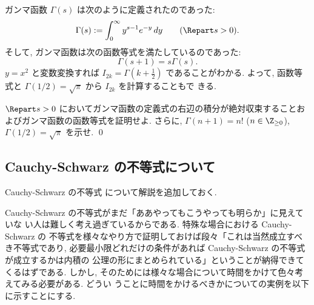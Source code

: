 \documentclass[12pt,twoside]{jarticle}
\begin{document}

\medskip

ガンマ函数 $\Gamma(s)$ は次のように定義されたのであった:
\begin{equation*}
  \Gamma(s) := \int_0^\infty y^{s-1} e^{-y}\,dy
  \qquad (\Repart s > 0).
\end{equation*}
そして, ガンマ函数は次の函数等式を満たしているのであった:
\begin{equation*}
  \Gamma(s+1) = s\Gamma(s).
\end{equation*}
$y=x^2$ と変数変換すれば $I_{2k} = \Gamma(k+\frac{1}{2})$ であることがわかる.
よって, 函数等式と $\Gamma(1/2)=\sqrt{\pi}$ から $I_{2k}$ を計算することもで
きる.

\begin{question}
\label{q:Gamma-function}
  $\Repart s > 0$ においてガンマ函数の定義式の右辺の積分が絶対収束することお
  よびガンマ函数の函数等式を証明せよ. 
  さらに, $\Gamma(n+1)=n!$ ($n\in\Z_{\ge0}$), $\Gamma(1/2)=\sqrt{\pi}$ を示せ.
  \qed
\end{question}


\subsection{Cauchy-Schwarz の不等式について}
\label{sec:Cauchy-Schwarz}

Cauchy-Schwarz の不等式  について解説を追加しておく.

Cauchy-Schwarz の不等式がまだ「ああやってもこうやっても明らか」に見えていな
い人は難しく考え過ぎているからである.  特殊な場合における Cauchy-Schwarz の
不等式を様々なやり方で証明しておけば段々「これは当然成立すべき不等式であり, 
必要最小限どれだけの条件があれば Cauchy-Schwarz の不等式が成立するかは内積の
公理の形にまとめられている」ということが納得できてくるはずである.  しかし,
そのためには様々な場合について時間をかけて色々考えてみる必要がある.  どうい
うことに時間をかけるべきかについての実例を以下に示すことにする.
\end{document}
